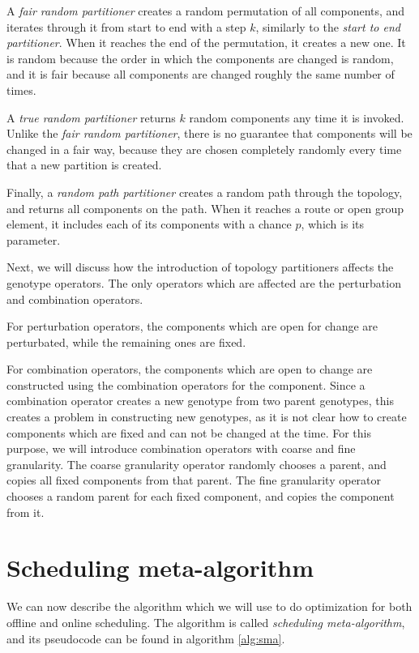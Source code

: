 A \textit{fair random partitioner} creates a random permutation of all components, and iterates through it from start to end with a step $k$, similarly to the \textit{start to end partitioner}. When it reaches the end of the permutation, it creates a new one. It is random because the order in which the components are changed is random, and it is fair because all components are changed roughly the same number of times.

A \textit{true random partitioner} returns $k$ random components any time it is invoked. Unlike the \textit{fair random partitioner}, there is no guarantee that components will be changed in a fair way, because they are chosen completely randomly every time that a new partition is created.

Finally, a \textit{random path partitioner} creates a random path through the topology, and returns all components on the path. When it reaches a route or open group element, it includes each of its components with a chance $p$, which is its parameter.

Next, we will discuss how the introduction of topology partitioners affects the genotype operators. The only operators which are affected are the perturbation and combination operators.

For perturbation operators, the components which are open for change are perturbated, while the remaining ones are fixed. 

For combination operators, the components which are open to change are constructed using the combination operators for the component. Since a combination operator creates a new genotype from two parent genotypes, this creates a problem in constructing new genotypes, as it is not clear how to create components which are fixed and can not be changed at the time. For this purpose, we will introduce combination operators with coarse and fine granularity. The coarse granularity operator randomly chooses a parent, and copies all fixed components from that parent. The fine granularity operator chooses a random parent for each fixed component, and copies the component from it.

\section{Scheduling meta-algorithm}
\label{sec:scheduling_meta_algorithm}

We can now describe the algorithm which we will use to do optimization for both offline and online scheduling. The algorithm is called \textit{scheduling meta-algorithm}, and its pseudocode can be found in algorithm \ref{alg:sma}.

